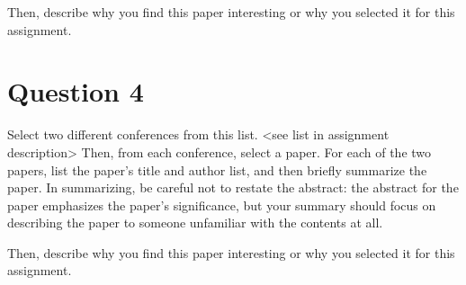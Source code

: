 Then, describe why you find this paper interesting or why you selected it for this assignment.

\section{Question 4}

Select two different conferences from this list. <see list in assignment description>
  Then, from each conference, select a paper.
  For each of the two papers, list the paper’s title and author list, and then briefly summarize the paper.
  In summarizing, be careful not to restate the abstract:
    the abstract for the paper emphasizes the paper’s significance,
    but your summary should focus on describing the paper to someone unfamiliar with the contents at all.

Then, describe why you find this paper interesting or why you selected it for this assignment.


